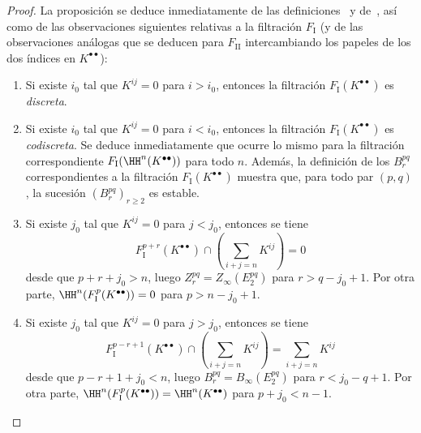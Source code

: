 \documentclass[oneside]{amsart}
\renewcommand{\geq}{\geqslant}
\newcommand{\oldpage}[2][]{{\marginnote{\normalfont\textbf{#1}~|~#2}}\ignorespaces}
\begin{document}
\begin{proof}
La proposición se deduce inmediatamente de las definiciones~ y de~, así como de las observaciones siguientes relativas a la filtración $F_\mathrm{I}$ (y de las observaciones análogas que se deducen para $F_\mathrm{II}$ intercambiando los papeles de los dos índices en $K^{\bullet\bullet}$):
\begin{enumerate}
  \item[{$1^{\circ}$}] Si existe $i_0$ tal que $K^{ij}=0$ para $i>i_0$, entonces la filtración $F_\mathrm{I}(K^{\bullet\bullet})$ es \emph{discreta}.
  \item[{$2^{\circ}$}] Si existe $i_0$ tal que $K^{ij}=0$ para $i<i_0$, entonces la filtración $F_\mathrm{I}(K^{\bullet\bullet})$ es \emph{codiscreta}.
    Se deduce inmediatamente que ocurre lo mismo para la filtración correspondiente $F_\mathrm{I}(\HH^n(K^{\bullet\bullet}))$ para todo $n$.
    Además, la definición de los $B_{r}^{pq}$ correspondientes a la filtración $F_\mathrm{I}(K^{\bullet\bullet})$  muestra que, para todo par $(p,q)$, la sucesión $(B_{r}^{pq})_{r\geq 2}$ es estable.
  \item[{$3^{\circ}$}] Si existe $j_0$ tal que $K^{ij}=0$ para $j<j_0$, entonces se tiene
    \[
      F_\mathrm{I}^{p+r}(K^{\bullet\bullet})
      \cap (\sum_{i+j=n}K^{ij})
      = 0
    \]
    desde que $p+r+j_{0}>n$, luego $Z_{r}^{pq} = Z_\infty(E_2^{pq})$ para $r>q-j_{0}+1$.
    Por otra parte, $\HH^{n}(F_\mathrm{I}^{p}(K^{\bullet\bullet})) = 0$ para $p>n-j_{0}+1$.
  \item[{$4^{\circ}$}] Si existe $j_0$ tal que $K^{ij}=0$ para $j>j_0$, entonces se tiene
    \[
      F_\mathrm{I}^{p-r+1}(K^{\bullet\bullet})
      \cap (\sum_{i+j=n}K^{ij})
      = \sum_{i+j=n}K^{ij}
    \]
    \oldpage[0\textsubscript{III}]{31}
    desde que $p-r+1+j_{0}<n$, luego $B_{r}^{pq} = B_\infty(E_2^{pq})$ para $r<j_{0}-q+1$.
    Por otra parte, $\HH^{n}(F_\mathrm{I}^{p}(K^{\bullet\bullet})) = \HH^{n}(K^{\bullet\bullet})$ para $p+j_{0}<n-1$.
\end{enumerate}
\end{proof}
\end{document}
